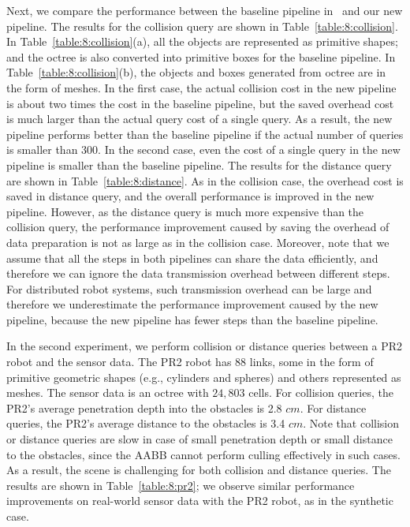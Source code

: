 Next, we compare the performance between the baseline pipeline in~\cite{Rusu:RPG:2009} and our new
pipeline. The results for the collision query are shown in
Table~\ref{table:8:collision}. In
Table~\ref{table:8:collision}(a), all the objects are represented as
primitive shapes; and the octree is also converted into primitive
boxes for the baseline pipeline. In
Table~\ref{table:8:collision}(b), the objects and boxes generated from
octree are in the form of meshes. In the first case, the actual
collision cost in the new pipeline is about two times the cost in the
baseline pipeline, but the saved overhead cost is much larger than the actual query cost of a single
query. As a result, the new pipeline performs better than the baseline
pipeline if the actual number of queries is smaller than $300$. In the
second case, even the cost of a single query in the new pipeline is
smaller than the baseline pipeline. The results for the distance query are
shown in Table~\ref{table:8:distance}. As in the collision case, the
overhead cost is saved in distance query, and the overall performance is improved in the new
pipeline. However, as the distance query is much more expensive than
the collision query, the performance improvement caused by saving the
overhead of data preparation is not as large as in the collision case. Moreover, note that we assume that all the steps in both pipelines can share the data
efficiently, and therefore we can ignore the data transmission overhead
between different \mbox{steps}. For distributed robot systems, such
transmission overhead can be large and therefore we underestimate the
performance improvement caused by the new pipeline, because the new
pipeline has fewer steps than the baseline pipeline.

In the second experiment, we perform collision or distance queries
between a PR2 robot and the sensor data. The PR2 robot has $88$ links,
some in the form of primitive geometric shapes (e.g., cylinders and spheres) and others represented as meshes. The sensor data is an octree with $24,803$ cells. For collision queries, the PR2's average penetration depth into the obstacles is 2.8 $cm$. For distance queries, the PR2's average distance to the obstacles is 3.4 $cm$. Note that collision or distance queries are slow in case of small penetration depth or small distance to the obstacles, since the AABB cannot perform culling effectively in such cases. As a result, the scene is challenging for both collision and distance queries. The results are shown in Table~\ref{table:8:pr2}; we observe similar performance improvements on real-world sensor data with the PR2 robot, as in the synthetic case.

